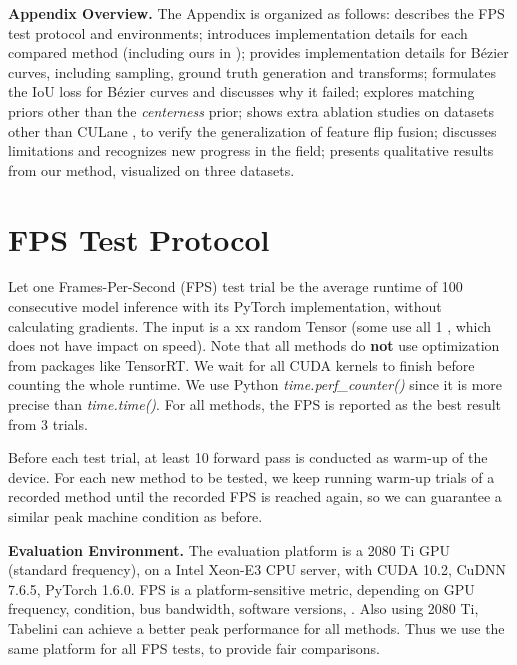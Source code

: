 \documentclass[10pt,twocolumn,letterpaper]{article}
\begin{document}
\clearpage

\appendix


\noindent \textbf{Appendix Overview.} The Appendix is organized as follows:  describes the FPS test protocol and environments;  introduces implementation details for each compared method (including ours in );  provides implementation details for Bézier curves, including sampling, ground truth generation and transforms;  formulates the IoU loss for Bézier curves and discusses why it failed;  explores matching priors other than the \textit{centerness} prior;  shows extra ablation studies on datasets other than CULane \cite{pan2018spatial}, to verify the generalization of feature flip fusion;  discusses limitations and recognizes new progress in the field;  presents qualitative results from our method, visualized on three datasets.

\section{FPS Test Protocol}
\label{sec:fps}

Let one Frames-Per-Second (FPS) test trial be the average runtime of 100 consecutive model inference with its PyTorch \cite{paszke2019pytorch} implementation, without calculating gradients. The input is a xx random Tensor (some use all 1 \cite{tabelini2021keep}, which does not have impact on speed). Note that all methods do \textbf{not} use optimization from packages like TensorRT. We wait for all CUDA kernels to finish before counting the whole runtime. We use Python \textit{time.perf\_counter()} since it is more precise than \textit{time.time()}. For all methods, the FPS is reported as the best result from 3 trials.

Before each test trial, at least 10 forward pass is conducted as warm-up of the device. For each new method to be tested, we keep running warm-up trials of a recorded method until the recorded FPS is reached again, so we can guarantee a similar peak machine condition as before.

\vspace{1mm}

\noindent \textbf{Evaluation Environment.} The evaluation platform is a 2080 Ti GPU (standard frequency), on a Intel Xeon-E3 CPU server, with CUDA 10.2, CuDNN 7.6.5, PyTorch 1.6.0. FPS is a platform-sensitive metric, depending on GPU frequency, condition, bus bandwidth, software versions, \etc. Also using 2080 Ti, Tabelini \etal \cite{tabelini2021keep} can achieve a better peak performance for all methods. Thus we use the same platform for all FPS tests, to provide fair comparisons.
\end{document}

